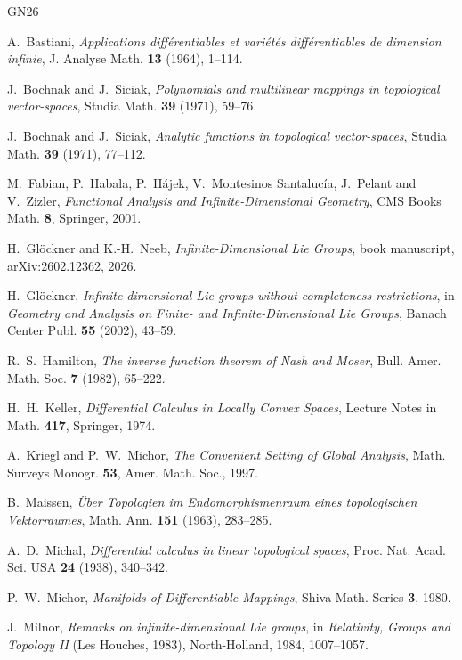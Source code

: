 \begin{thebibliography}{GN26}

A.~Bastiani, \emph{Applications différentiables et variétés différentiables de dimension
infinie}, J. Analyse Math. \textbf{13} (1964), 1--114.

J.~Bochnak and J.~Siciak, \emph{Polynomials and multilinear mappings in topological
vector-spaces}, Studia Math. \textbf{39} (1971), 59--76.

J.~Bochnak and J.~Siciak, \emph{Analytic functions in topological vector-spaces}, Studia Math.
\textbf{39} (1971), 77--112.

M.~Fabian, P.~Habala, P.~Hájek, V.~Montesinos Santalucía, J.~Pelant and V.~Zizler,
\emph{Functional Analysis and Infinite-Dimensional Geometry}, CMS Books Math. \textbf{8},
Springer, 2001.

H.~Glöckner and K.-H.~Neeb, \emph{Infinite-Dimensional Lie Groups}, book manuscript,
arXiv:2602.12362, 2026.

H.~Glöckner, \emph{Infinite-dimensional Lie groups without completeness restrictions}, in
\emph{Geometry and Analysis on Finite- and Infinite-Dimensional Lie Groups}, Banach Center
Publ. \textbf{55} (2002), 43--59.

R.~S.~Hamilton, \emph{The inverse function theorem of Nash and Moser}, Bull. Amer. Math. Soc.
\textbf{7} (1982), 65--222.

H.~H.~Keller, \emph{Differential Calculus in Locally Convex Spaces}, Lecture Notes in Math.
\textbf{417}, Springer, 1974.

A.~Kriegl and P.~W.~Michor, \emph{The Convenient Setting of Global Analysis}, Math. Surveys
Monogr. \textbf{53}, Amer. Math. Soc., 1997.

B.~Maissen, \emph{Über Topologien im Endomorphismenraum eines topologischen Vektorraumes},
Math. Ann. \textbf{151} (1963), 283--285.

A.~D.~Michal, \emph{Differential calculus in linear topological spaces}, Proc. Nat. Acad. Sci.
USA \textbf{24} (1938), 340--342.

P.~W.~Michor, \emph{Manifolds of Differentiable Mappings}, Shiva Math. Series \textbf{3}, 1980.

J.~Milnor, \emph{Remarks on infinite-dimensional Lie groups}, in \emph{Relativity, Groups and
Topology II} (Les Houches, 1983), North-Holland, 1984, 1007--1057.


\end{thebibliography}

